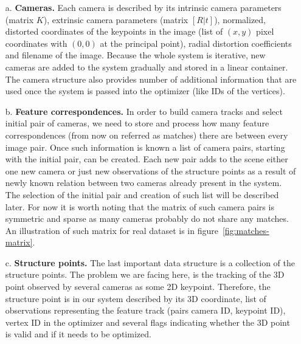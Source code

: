 \begin{itemize}
	\item[a.] \textbf{Cameras.} Each camera is described by its intrinsic camera parameters (matrix $K$), extrinsic camera parameters (matrix $[R|t]$), normalized, distorted coordinates of the keypoints in the image (list of $(x, y)$ pixel coordinates with $(0,0)$ at the principal point), radial distortion coefficients and filename of the image. Because the whole system is iterative, new cameras are added to the system gradually and stored in a linear container. The camera structure also provides number of additional information that are used once the system is passed into the optimizer (like IDs of the vertices).
	\item[b.] \textbf{Feature correspondences.} In order to build camera tracks and select initial pair of cameras, we need to store and process how many feature correspondences (from now on referred as matches) there are between every image pair. Once such information is known a list of camera pairs, starting with the initial pair, can be created. Each new pair adds to the scene either one new camera or just new observations of the structure points as a result of newly known relation between two cameras already present in the system. The selection of the initial pair and creation of such list will be described later. For now it is worth noting that the matrix of such camera pairs is symmetric and sparse as many cameras probably do not share any matches. An illustration of such matrix for real dataset is in figure~\ref{fig:matches-matrix}.
	\item[c.] \textbf{Structure points.} The last important data structure is a collection of the structure points. The problem we are facing here, is the tracking of the 3D point observed by several cameras as some 2D keypoint. Therefore, the structure point is in our system described by its 3D coordinate, list of observations representing the feature track (pairs camera ID, keypoint ID), vertex ID in the optimizer and several flags indicating whether the 3D point is valid and if it needs to be optimized.
\end{itemize}

